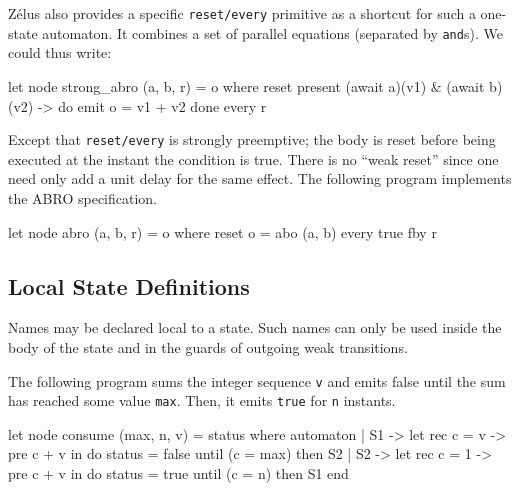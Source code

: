 \documentclass[11pt,titlepage,twoside]{report}
\makeatletter
\newcommand{\zls}[1]{{\@span{class="zelusinline"}#1}}
\newcommand{\zls}[1]{\texttt{#1}}
\renewcommand{\zls}[1]{\texttt{#1}}
\newcommand{\zelus}{{\sf Z\'elus}}
\makeatother
\begin{document}
\zelus{} also provides a specific \zls{reset/every} primitive as a shortcut 
for such a one-state automaton.
It combines a set of parallel equations (separated by \zls{and}s).
We could thus write:%
\begin{chklisting}[withresult,include=await]
let node strong_abro (a, b, r) = o where
  reset
    present (await a)(v1) & (await b)(v2) -> do emit o = v1 + v2 done
  every r
\end{chklisting}
Except that \zls{reset/every} is strongly preemptive; the body is reset 
before being executed at the instant the condition is true.
There is no ``weak reset'' since one need only add a unit delay for the same 
effect.
The following program implements the ABRO specification.
\begin{chklisting}[withresult,include=abo]
let node abro (a, b, r) = o where
reset
  o = abo (a, b)
every true fby r
\end{chklisting}



\subsection{Local State Definitions\label{statelocaldefs}} %

Names may be declared local to a state.
Such names can only be used inside the body of the state and in the guards 
of outgoing weak transitions.

The following program sums the integer sequence \zls{v} and emits 
false until the sum has reached some value \zls{max}. Then, it
emits \zls{true} for \zls{n} instants.
\begin{chklisting}
let node consume (max, n, v) = status where
  automaton
  | S1 ->
      let rec c = v -> pre c + v in
      do status = false
      until (c = max) then S2
  | S2 ->
      let rec c = 1 -> pre c + v in
      do status = true
      until (c = n) then S1
  end
\end{chklisting}
\end{document}
